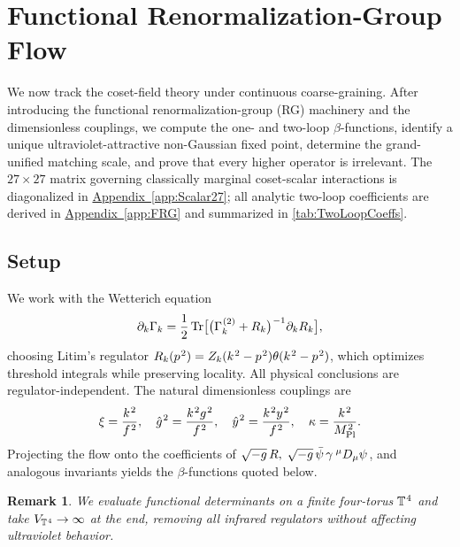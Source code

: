 \documentclass[pdflatex,sn-mathphys-num]{sn-jnl}
\theoremstyle{thmstyleone}
\theoremstyle{thmstyletwo}%
\newtheorem{remark}{Remark}%
\theoremstyle{thmstylethree}%
\newcommand{\Tr}{\operatorname{Tr}}
\newcommand{\sm}{\hspace{.065em}}
\newcommand{\appref}[1]{\hyperref[#1]{Appendix~\ref*{#1}}}
\newcommand{\smexp}[1]{^{\sm #1}}
\begin{document}
\section{Functional Renormalization‐Group Flow}
\label{sec:FRG}

We now track the coset-field theory under continuous coarse-graining.
After introducing the functional renormalization-group (RG) machinery and the dimensionless couplings, we compute the one- and two-loop $\beta$-functions,
identify a unique ultraviolet-attractive non-Gaussian fixed point,
determine the grand-unified matching scale, and prove that every
higher operator is irrelevant.  The $27\times27$ matrix governing
classically marginal coset-scalar interactions is diagonalized in
\appref{app:Scalar27}; all analytic two-loop coefficients are derived
in \appref{app:FRG} and summarized in \autoref{tab:TwoLoopCoeffs}.

\subsection{Setup}
\label{subsec:FRGsetup}
We work with the Wetterich equation
\[
  \partial_{k}\Gamma_{k}
  =\frac12\Tr\bigl[
    \bigl(\Gamma_{k}\smexp{(2)}+R_{k}\bigr)\smexp{-1}
    \partial_{k}R_{k}\bigr],
\]
choosing Litim’s regulator
\(
  R_{k}(p\smexp{2})=Z_{k}(k\smexp{2}-p\smexp{2})
  \theta(k\smexp{2}-p\smexp{2})
\),
which optimizes threshold integrals while preserving locality.  All
physical conclusions are regulator-independent. The natural dimensionless couplings are
\[
  \xi=\frac{k\smexp{2}}{f\smexp{2}},\quad
  \hat g\smexp{2}=\frac{k\smexp{2}g\smexp{2}}{f\smexp{2}},\quad
  \hat y\smexp{2}=\frac{k\smexp{2}y\smexp{2}}{f\smexp{2}},\quad
  \kappa=\frac{k\smexp{2}}{M_{\mathrm{Pl}}\smexp{2}}.
\]
Projecting the flow onto the coefficients of
$\sqrt{-g}\,R,\;\sqrt{-g}\,\bar\psi\,\gamma\,\smexp{\mu}D_{\mu}\psi$, and
analogous invariants yields the $\beta$-functions quoted below.

\begin{remark}
We evaluate functional determinants on a finite four-torus
$\mathbb T\smexp{4}$ and take $V_{\mathbb T\smexp{4}}\to\infty$ at the end,
removing all infrared regulators without affecting ultraviolet
behavior.
\end{remark}
\end{document}
